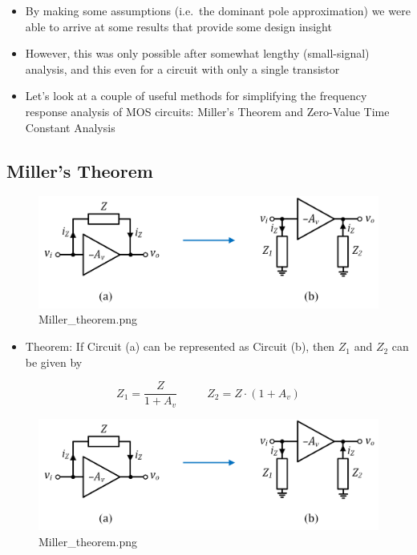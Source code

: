 \documentclass[11pt]{article}
\providecommand{\tightlist}{%
      \setlength{\itemsep}{0pt}\setlength{\parskip}{0pt}}
\begin{document}
    \begin{itemize}
\tightlist
\item
  By making some assumptions (i.e.~the dominant pole approximation) we
  were able to arrive at some results that provide some design insight
\item
  However, this was only possible after somewhat lengthy (small-signal)
  analysis, and this even for a circuit with only a single transistor
\item
  Let's look at a couple of useful methods for simplifying the frequency
  response analysis of MOS circuits: Miller's Theorem and Zero-Value
  Time Constant Analysis
\end{itemize}

    \hypertarget{millers-theorem}{%
\subsection{Miller's Theorem}\label{millers-theorem}}

    \begin{figure}
\centering
\includegraphics{Miller_theorem.png}
\caption{Miller\_theorem.png}
\end{figure}

    \begin{itemize}
\tightlist
\item
  Theorem: If Circuit (a) can be represented as Circuit (b), then
  \(Z_1\) and \(Z_2\) can be given by
\end{itemize}

\begin{equation}
Z_1 = \dfrac{Z}{1+A_v} \:\:\:\:\:\:\:\:\:\:\:\: Z_2 = Z\cdot (1+A_v)
\end{equation}

    \begin{figure}
\centering
\includegraphics{Miller_theorem.png}
\caption{Miller\_theorem.png}
\end{figure}
\end{document}
